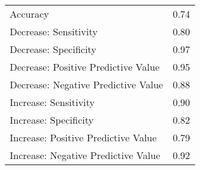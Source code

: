 \begin{table}[ht]
\centering
\begin{tabular}{lr}
  \hline
 &  \\ 
  \hline
Accuracy & 0.74 \\ 
  Decrease: Sensitivity & 0.80 \\ 
  Decrease: Specificity & 0.97 \\ 
  Decrease: Positive Predictive Value & 0.95 \\ 
  Decrease: Negative Predictive Value & 0.88 \\ 
  Increase: Sensitivity & 0.90 \\ 
  Increase: Specificity & 0.82 \\ 
  Increase: Positive Predictive Value & 0.79 \\ 
  Increase: Negative Predictive Value & 0.92 \\ 
   \hline
\end{tabular}
\end{table}
